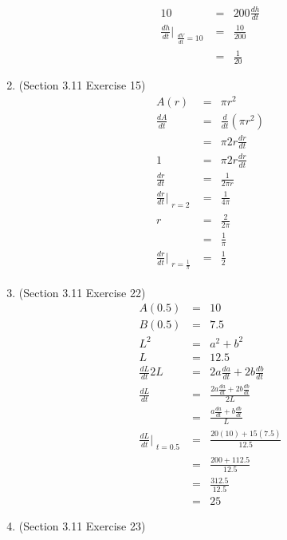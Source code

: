 \documentclass{article}
\begin{document}
\begin{enumerate}
\begin{eqnarray}
            10 &=& 200\frac{dh}{dt} \\
            \frac{dh}{dt}\Bigr|_{\substack{\frac{dV}{dt} = 10}} &=& \frac{10}{200} \\
                          &=& \frac{1}{20}
        \end{eqnarray}
    \item (Section 3.11 Exercise 15)
        \begin{eqnarray}
            A(r) &=& \pi r^2 \\
            \frac{dA}{dt} &=& \frac{d}{dt}\left(\pi r^2\right) \\
                          &=& \pi 2r \frac{dr}{dt} \\
            1 &=& \pi 2r \frac{dr}{dt} \\
            \frac{dr}{dt} &=& \frac{1}{2\pi r} \\
            \frac{dr}{dt}\Bigr|_{\substack{r = 2}} &=& \frac{1}{4\pi} \\
            r &=& \frac{2}{2\pi} \\
              &=& \frac{1}{\pi} \\
            \frac{dr}{dt}\Bigr|_{\substack{r = \frac{1}{\pi}}} &=& \frac{1}{2}
        \end{eqnarray}
    \item (Section 3.11 Exercise 22)
        \begin{eqnarray}
            A(0.5) &=& 10 \\
            B(0.5) &=& 7.5 \\
            L^2 &=& a^2 + b^2 \\
            L &=& 12.5 \\
            \frac{dL}{dt}2L &=& 2a\frac{da}{dt} + 2b\frac{db}{dt} \\
            \frac{dL}{dt} &=& \frac{2a\frac{da}{dt} + 2b\frac{db}{dt}}{2L} \\
                          &=& \frac{a\frac{da}{dt} + b\frac{db}{dt}}{L} \\
            \frac{dL}{dt}\Bigr|_{\substack{t = 0.5}} &=& \frac{20(10) + 15(7.5)}{12.5} \\
                                                     &=& \frac{200 + 112.5}{12.5} \\
                                                     &=& \frac{312.5}{12.5} \\
                                                     &=& 25
        \end{eqnarray}
    \item (Section 3.11 Exercise 23)

\end{enumerate}
\end{document}
